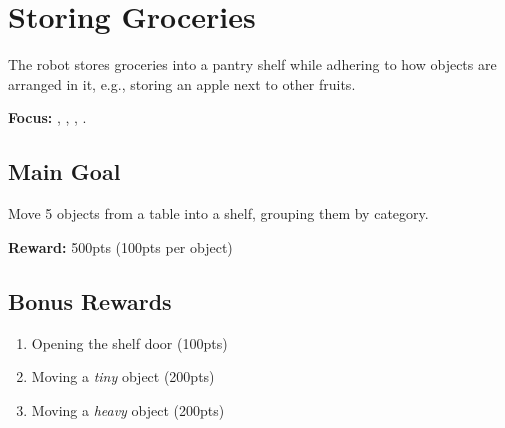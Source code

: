 \section{Storing Groceries}
\label{test:storing-groceries}
The robot stores groceries into a pantry shelf while adhering to how objects are arranged in it, e.g., storing an apple next to other fruits.

\noindent \textbf{Focus:} \SysI, \MAN, \CV, \OR.


\subsection*{Main Goal}
Move 5 objects from a table into a shelf, grouping them by category.

\noindent\textbf{Reward:} 500pts (100pts per object)

\subsection*{Bonus Rewards}
\begin{enumerate}[nosep]
	\item Opening the shelf door (100pts)
	\item Moving a \emph{tiny} object (200pts)
	\item Moving a \emph{heavy} object (200pts)
\end{enumerate}

%
%
